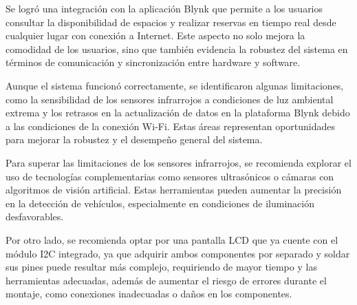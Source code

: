 \documentclass[12pt,a4paper]{article}
\begin{document}
Se logró una integración con la aplicación Blynk que permite a los usuarios consultar la disponibilidad de espacios y realizar reservas en tiempo real desde cualquier lugar con conexión a Internet. Este aspecto no solo mejora la comodidad de los usuarios, sino que también evidencia la robustez del sistema en términos de comunicación y sincronización entre hardware y software.

Aunque el sistema funcionó correctamente, se identificaron algunas limitaciones, como la sensibilidad de los sensores infrarrojos a condiciones de luz ambiental extrema y los retrasos en la actualización de datos en la plataforma Blynk debido a las condiciones de la conexión Wi-Fi. Estas áreas representan oportunidades para mejorar la robustez y el desempeño general del sistema.

Para superar las limitaciones de los sensores infrarrojos, se recomienda explorar el uso de tecnologías complementarias como sensores ultrasónicos o cámaras con algoritmos de visión artificial. Estas herramientas pueden aumentar la precisión en la detección de vehículos, especialmente en condiciones de iluminación desfavorables.

Por otro lado, se recomienda optar por una pantalla LCD que ya cuente con el módulo I2C integrado, ya que adquirir ambos componentes por separado y soldar sus pines puede resultar más complejo, requiriendo de mayor tiempo y las herramientas adecuadas, además de aumentar el riesgo de errores durante el montaje, como conexiones inadecuadas o daños en los componentes.
\end{document}
